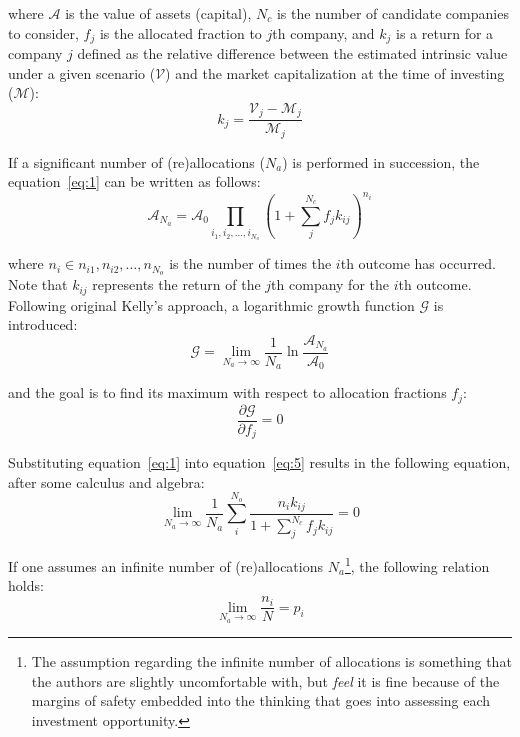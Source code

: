 \documentclass{article}
\begin{document}
\noindent where $\mathcal{A}$ is the value of assets (capital), $N_c$ is the
number of candidate companies to consider, $f_j$ is the allocated fraction to
$j$th company, and $k_j$ is a return for a company $j$ defined as the relative
difference between the estimated intrinsic value under a given scenario
($\mathcal{V}$) and the market capitalization at the time of investing
($\mathcal{M}$):
\begin{equation}
\label{eq:2}
    k_j = \frac{\mathcal{V}_j - \mathcal{M}_j}{\mathcal{M}_j}
\end{equation}

\noindent If a significant number of (re)allocations ($N_a$) is performed in
succession, the equation~\eqref{eq:1} can be written as follows:
\begin{equation}
\label{eq:3}
    \mathcal{A}_{N_a}
  = 
    \mathcal{A}_{0} \prod_{i_1, i_2, \hdots, i_{N_o}}
    \left( 1 + \sum_{j}^{N_c} f_j k_{ij} \right)^{n_i}
\end{equation} 

\noindent where $n_i \in {n_{i1}, n_{i2}, \hdots, n_{N_o}}$ is the number of
times the $i$th outcome has occurred. Note that $k_{ij}$ represents the return
of the $j$th company for the $i$th outcome. Following original Kelly's approach,
a logarithmic growth function $\mathcal{G}$ is introduced:
\begin{equation}
\label{eq:4}
    \mathcal{G} = \lim_{N_a \to \infty} \frac{1}{N_a} \ln
        \frac{\mathcal{A}_{N_a}}{\mathcal{A}_0}
\end{equation}

\noindent and the goal is to find its maximum with respect to allocation
fractions $f_j$:
\begin{equation}
\label{eq:5}
    \frac{\partial \mathcal{G}}{\partial f_j} = 0
\end{equation}

\noindent Substituting equation~\eqref{eq:1} into equation~\eqref{eq:5} results
in the following equation, after some calculus and algebra:
\begin{equation}
\label{eq:6}
    \lim_{N_a \to \infty} \frac{1}{N_a}
    \sum_{i}^{N_o} \frac{n_i k_{ij}}{1 + \sum_{j}^{N_c} f_j k_{ij}} = 0
\end{equation}

\noindent If one assumes an infinite number of (re)allocations
$N_a$\footnote{The assumption regarding the infinite number of allocations is
something that the authors are slightly uncomfortable with, but \textit{feel}
it is fine because of the margins of safety embedded into the thinking that goes
into assessing each investment opportunity.}, the following relation holds:
\begin{equation}
\label{eq:7}
    \lim_{N_a \to \infty} \frac{n_i}{N} = p_i
\end{equation}
\end{document}
